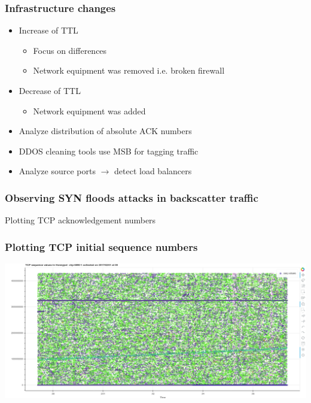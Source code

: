 \documentclass{beamer}
\begin{document}
\begin{frame}
    \frametitle{Infrastructure changes}
    \begin{itemize}
        \item Increase of TTL
        \begin{itemize}
            \item Focus on differences
            \item Network equipment was removed  i.e. broken firewall
        \end{itemize}
        \item Decrease of TTL
        \begin{itemize}
            \item Network equipment was added 
        \end{itemize}
        \item Analyze distribution of absolute ACK numbers
        \item DDOS cleaning tools use MSB for tagging traffic
        \item Analyze source ports $\to$ detect load balancers
    \end{itemize}
\end{frame}

\begin{frame}
    \frametitle{Observing SYN floods attacks in backscatter traffic}
    Plotting TCP acknowledgement numbers
    \begin{center}
        \scalebox{0.7}{}
    \end{center}
\end{frame}

\begin{frame}
    \frametitle{Plotting TCP initial sequence numbers}
    \begin{center}
        \centerline{\includegraphics[scale=0.23]{isn-1.png}}
    \end{center}
\end{frame}
\end{document}
